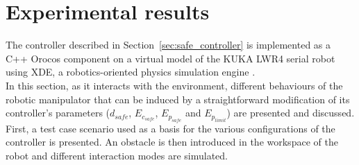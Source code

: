 \documentclass[letterpaper, 10 pt, conference]{ieeeconf}      %
\begin{document}
\section{Experimental results}
\label{sec:exp_results}
The controller described in Section~\ref{sec:safe_controller} is implemented as a C++ Orocos component \allowbreak\cite{rtt-url} on a virtual model of the KUKA LWR4 serial robot using XDE, a robotics-oriented physics simulation engine \cite{merlhiot2012}.
\\
In this section, as it interacts with the environment, different behaviours of the robotic manipulator that can be induced by a straightforward modification of its controller's parameters ($d_{safe}$, $E_{c_{safe}}$, $E_{p_{safe}}$ and $E_{p_{limit}}$) are presented and discussed. First, a test case scenario used as a basis for the various configurations of the controller is presented. An obstacle is then introduced in the workspace of the robot and different interaction modes are simulated. 
\end{document}
